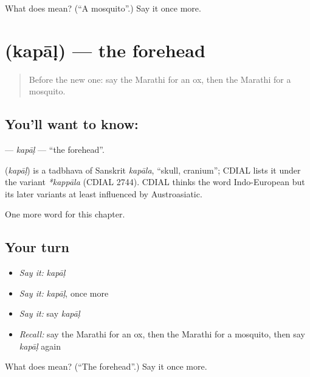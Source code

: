 \begin{tcolorbox}[breakable,colback=teal!4,colframe=teal!35!black,title={Before you move on}]
What does  mean? (\textquotedblleft{}A mosquito\textquotedblright{}.) Say it once more.
\end{tcolorbox}
\section[\texorpdfstring{\mr{कपाळ} (kapāḷ)}{कपाळ (kapāḷ)}]{ (kapāḷ) — the forehead}

\label{lesson:MR-C144-kapal}



\begin{quote}
Before the new one: say the Marathi for an ox, then the Marathi for a mosquito.
\end{quote}

\subsection*{You'll want to know: }
\textbf{} — \emph{kapāḷ} — \textquotedblleft{}the forehead\textquotedblright{}.

\begin{cousinweb}
\textbf{} (\emph{kapāḷ}) is a tadbhava of Sanskrit \emph{kapāla}, \textquotedblleft{}skull, cranium\textquotedblright{}; CDIAL lists it under the variant \emph{*kappāla} (CDIAL 2744). CDIAL thinks the word Indo-European but its later variants at least influenced by Austroasiatic.
\end{cousinweb}

\begin{grammarlens}[title={What you've built}]
One more word for this chapter.
\end{grammarlens}

\subsection*{Your turn}
\begin{itemize}
\raggedright
  \item \emph{Say it:} \emph{kapāḷ}
  \item \emph{Say it:} \emph{kapāḷ}, once more
  \item \emph{Say it:} say \emph{kapāḷ}
  \item \emph{Recall:} say the Marathi for an ox, then the Marathi for a mosquito, then say \emph{kapāḷ} again
\end{itemize}

\begin{tcolorbox}[breakable,colback=teal!4,colframe=teal!35!black,title={Before you move on}]
What does  mean? (\textquotedblleft{}The forehead\textquotedblright{}.) Say it once more.
\end{tcolorbox}
